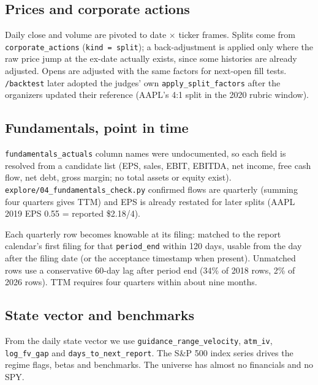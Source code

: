 \documentclass[11pt]{article}
\newcommand{\code}[1]{\texttt{#1}}
\begin{document}
\subsection{Prices and corporate actions}
Daily close and volume are pivoted to date $\times$ ticker frames. Splits come from \code{corporate\_actions}
(\code{kind = split}); a back-adjustment is applied only where the raw price jump at the ex-date actually exists, since
some histories are already adjusted. Opens are adjusted with the same factors for next-open fill tests.
\code{/backtest} later adopted the judges' own \code{apply\_split\_factors} after the organizers updated their
reference (AAPL's 4:1 split in the 2020 rubric window).

\subsection{Fundamentals, point in time}
\code{fundamentals\_actuals} column names were undocumented, so each field is resolved from a candidate list (EPS,
sales, EBIT, EBITDA, net income, free cash flow, net debt, gross margin; no total assets or equity exist).
\code{explore/04\_fundamentals\_check.py} confirmed flows are quarterly (summing four quarters gives TTM) and EPS is
already restated for later splits (AAPL 2019 EPS 0.55 = reported \$2.18/4).

Each quarterly row becomes knowable at its filing: matched to the report calendar's first filing for that
\code{period\_end} within 120 days, usable from the day after the filing date (or the acceptance timestamp when
present). Unmatched rows use a conservative 60-day lag after period end (34\% of 2018 rows, 2\% of 2026 rows).
TTM requires four quarters within about nine months.

\subsection{State vector and benchmarks}
From the daily state vector we use \code{guidance\_range\_velocity}, \code{atm\_iv}, \code{log\_fv\_gap} and
\code{days\_to\_next\_report}. The S\&P 500 index series drives the regime flags, betas and benchmarks. The universe
has almost no financials and no SPY.
\end{document}
